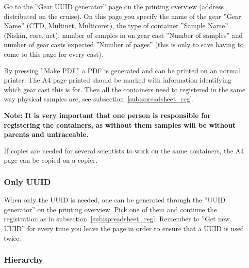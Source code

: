 \documentclass[a4paper,english, 11pt]{article}
\begin{document}
Go to the ''Gear UUID generator'' page on the printing overview (address distributed on the cruise). 
On this page you specify the name of the gear ''Gear Name'' (CTD, Multinet, Multicorer), the type of container ''Sample Name'' (Niskin, core, net), number of samples in on gear cast ''Number of samples'' and number of gear casts expected ''Number of pages'' (this is only to save having to come to this page for every cast). 

By pressing ''Make PDF'' a PDF is generated and can be printed on an normal printer. The A4 page printed should be marked with information identifying which gear cast this is for. Then all the containers need to registered in the same way physical samples are, see subsection~\ref{sub:spreadsheet_reg}.

\textbf{Note: It is very important that one person is responsible for registering the containers, as without them samples will be without parents and untraceable.}

If copies are needed for several scientists to work on the same containers, the A4 page can be copied on a copier. 


\subsubsection{Only UUID} %
\label{ssub:Only_UUID}

When only the UUID is needed, one can be generated through the ''UUID generator'' on the printing overview. Pick one of them and continue the registration as in subsection~\ref{sub:spreadsheet_reg}. Remember to ''Get new UUID'' for every time you leave the page in order to ensure that a UUID is used twice.  


\subsubsection{Hierarchy} %
\label{sub:Hirarcy}
\end{document}
